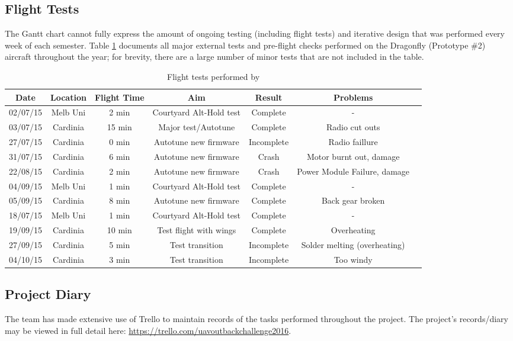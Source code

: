 \subsection{Flight Tests}
\label{sec:diary}
The Gantt chart cannot fully express the amount of ongoing testing (including flight tests) and iterative design that was performed every week of each semester. Table \ref{tab:tests} documents all major external tests and pre-flight checks performed on the Dragonfly (Prototype \#2) aircraft throughout the year; for brevity, there are a large number of minor tests that are not included in the table. 

\begin{table}[H]
	\centering
	\caption{Flight tests performed by \ID}
	\begin{tabular}{|c|c|c|c|c|c|c|}
		\hline Date & Location & Flight Time & Aim & Result & Problems \\
		\hline 02/07/15 & Melb Uni & 2 min & Courtyard Alt-Hold test & Complete & - \\ 
		\hline 03/07/15 & Cardinia & 15 min & Major test/Autotune & Complete & Radio cut outs \\ 
		\hline 27/07/15 & Cardinia  & 0 min & Autotune new firmware & Incomplete & Radio faillure \\ 
		\hline 31/07/15 & Cardinia  & 6 min & Autotune new firmware & Crash & Motor burnt out, damage  \\ 
		\hline 22/08/15 & Cardinia  & 2 min & Autotune new firmware & Crash & Power Module Failure, damage\\
		\hline 04/09/15 & Melb Uni & 1 min & Courtyard Alt-Hold test & Complete & - \\  
		\hline 05/09/15 & Cardinia  & 8 min & Autotune new firmware & Complete & Back gear broken\\
		\hline 18/07/15 & Melb Uni & 1 min & Courtyard Alt-Hold test & Complete & - \\  
		\hline 19/09/15 & Cardinia  & 10 min & Test flight with wings & Complete & Overheating \\ 
		\hline 27/09/15 & Cardinia  & 5 min & Test transition & Incomplete & Solder melting (overheating) \\
		\hline 04/10/15 & Cardinia & 3 min & Test transition & Incomplete & Too windy\\
		\hline 
	\end{tabular} 
	\label{tab:tests}
\end{table}

\subsection{Project Diary}
The team has made extensive use of Trello to maintain records of the tasks performed throughout the project. The project's records/diary may be viewed in full detail here: \url{https://trello.com/uavoutbackchallenge2016}.

